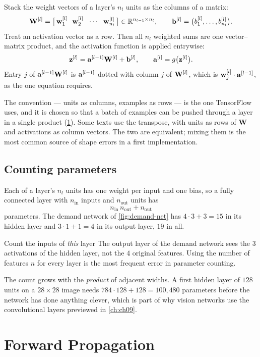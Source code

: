 Stack the weight vectors of a layer's $n_l$ units as the columns of a matrix:
\[
  \mathbf{W}^{[l]} = \bigl[\,\mathbf{w}^{[l]}_1\ \ \mathbf{w}^{[l]}_2\ \ \cdots\ \ \mathbf{w}^{[l]}_{n_l}\,\bigr]
  \in \mathbb{R}^{n_{l-1}\times n_l},
  \qquad
  \mathbf{b}^{[l]} = \bigl(b^{[l]}_1, \dots, b^{[l]}_{n_l}\bigr).
\]
Treat an activation vector as a row. Then all $n_l$ weighted sums are one
vector--matrix product, and the activation function is applied entrywise:
\[
  \mathbf{z}^{[l]} = \mathbf{a}^{[l-1]}\mathbf{W}^{[l]} + \mathbf{b}^{[l]}, \qquad
  \mathbf{a}^{[l]} = g\bigl(\mathbf{z}^{[l]}\bigr).
\]
Entry $j$ of $\mathbf{a}^{[l-1]}\mathbf{W}^{[l]}$ is $\mathbf{a}^{[l-1]}$ dotted with column $j$ of
$\mathbf{W}^{[l]}$, which is $\mathbf{w}^{[l]}_j\cdot\mathbf{a}^{[l-1]}$, as the one equation requires.

The convention --- units as columns, examples as rows --- is the one TensorFlow
uses, and it is chosen so that a batch of examples can be pushed through a layer
in a single product (\cref{sec:forward-prop}). Some texts use the transpose,
with units as rows of $\mathbf{W}$ and activations as column vectors. The two
are equivalent; mixing them is the most common source of shape errors in a first
implementation.

\subsection{Counting parameters}

Each of a layer's $n_l$ units has one weight per input and one bias, so a fully
connected layer with $n_{\text{in}}$ inputs and $n_{\text{out}}$ units has
\[
  n_{\text{in}}\,n_{\text{out}} + n_{\text{out}}
\]
parameters. The demand network of \cref{fig:demand-net} has $4\cdot3+3 = 15$
in its hidden layer and $3\cdot1+1 = 4$ in its output layer, $19$ in all.

\begin{pitfall}{Count the inputs of \emph{this} layer}
The output layer of the demand network sees the $3$ activations of the hidden
layer, not the $4$ original features. Using the number of features $n$ for every
layer is the most frequent error in parameter counting.
\end{pitfall}

The count grows with the \emph{product} of adjacent widths. A first hidden layer
of $128$ units on a $28\times28$ image needs $784\cdot128+128 = 100{,}480$
parameters before the network has done anything clever, which is part of why
vision networks use the convolutional layers previewed in \cref{ch:ch09}.

\section{Forward Propagation}
\label{sec:forward-prop}

